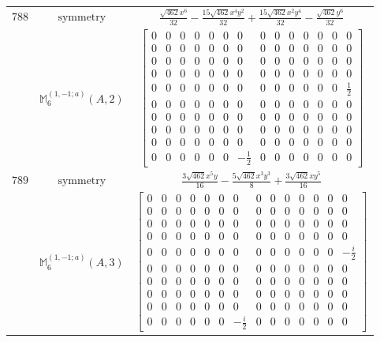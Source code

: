 \documentclass[fleqn,8pt,landscape]{jsarticle}
\begin{document}
\begin{longtable}{ccc}
$ 788 $ & $ \text{symmetry} $ & $ \frac{\sqrt{462} x^{6}}{32} - \frac{15 \sqrt{462} x^{4} y^{2}}{32} + \frac{15 \sqrt{462} x^{2} y^{4}}{32} - \frac{\sqrt{462} y^{6}}{32} $ \\
$  $ & $ \mathbb{M}_{6}^{(1,-1;a)}(A,2) $ & $ \begin{bmatrix} 0 & 0 & 0 & 0 & 0 & 0 & 0 & 0 & 0 & 0 & 0 & 0 & 0 & 0 \\ 0 & 0 & 0 & 0 & 0 & 0 & 0 & 0 & 0 & 0 & 0 & 0 & 0 & 0 \\ 0 & 0 & 0 & 0 & 0 & 0 & 0 & 0 & 0 & 0 & 0 & 0 & 0 & 0 \\ 0 & 0 & 0 & 0 & 0 & 0 & 0 & 0 & 0 & 0 & 0 & 0 & 0 & 0 \\ 0 & 0 & 0 & 0 & 0 & 0 & 0 & 0 & 0 & 0 & 0 & 0 & 0 & \frac{1}{2} \\ 0 & 0 & 0 & 0 & 0 & 0 & 0 & 0 & 0 & 0 & 0 & 0 & 0 & 0 \\ 0 & 0 & 0 & 0 & 0 & 0 & 0 & 0 & 0 & 0 & 0 & 0 & 0 & 0 \\ 0 & 0 & 0 & 0 & 0 & 0 & 0 & 0 & 0 & 0 & 0 & 0 & 0 & 0 \\ 0 & 0 & 0 & 0 & 0 & 0 & 0 & 0 & 0 & 0 & 0 & 0 & 0 & 0 \\ 0 & 0 & 0 & 0 & 0 & 0 & - \frac{1}{2} & 0 & 0 & 0 & 0 & 0 & 0 & 0 \end{bmatrix} $ \\ \hline
$ 789 $ & $ \text{symmetry} $ & $ \frac{3 \sqrt{462} x^{5} y}{16} - \frac{5 \sqrt{462} x^{3} y^{3}}{8} + \frac{3 \sqrt{462} x y^{5}}{16} $ \\
$  $ & $ \mathbb{M}_{6}^{(1,-1;a)}(A,3) $ & $ \begin{bmatrix} 0 & 0 & 0 & 0 & 0 & 0 & 0 & 0 & 0 & 0 & 0 & 0 & 0 & 0 \\ 0 & 0 & 0 & 0 & 0 & 0 & 0 & 0 & 0 & 0 & 0 & 0 & 0 & 0 \\ 0 & 0 & 0 & 0 & 0 & 0 & 0 & 0 & 0 & 0 & 0 & 0 & 0 & 0 \\ 0 & 0 & 0 & 0 & 0 & 0 & 0 & 0 & 0 & 0 & 0 & 0 & 0 & 0 \\ 0 & 0 & 0 & 0 & 0 & 0 & 0 & 0 & 0 & 0 & 0 & 0 & 0 & - \frac{i}{2} \\ 0 & 0 & 0 & 0 & 0 & 0 & 0 & 0 & 0 & 0 & 0 & 0 & 0 & 0 \\ 0 & 0 & 0 & 0 & 0 & 0 & 0 & 0 & 0 & 0 & 0 & 0 & 0 & 0 \\ 0 & 0 & 0 & 0 & 0 & 0 & 0 & 0 & 0 & 0 & 0 & 0 & 0 & 0 \\ 0 & 0 & 0 & 0 & 0 & 0 & 0 & 0 & 0 & 0 & 0 & 0 & 0 & 0 \\ 0 & 0 & 0 & 0 & 0 & 0 & - \frac{i}{2} & 0 & 0 & 0 & 0 & 0 & 0 & 0 \end{bmatrix} $ \\ \hline

\end{longtable}
\end{document}
